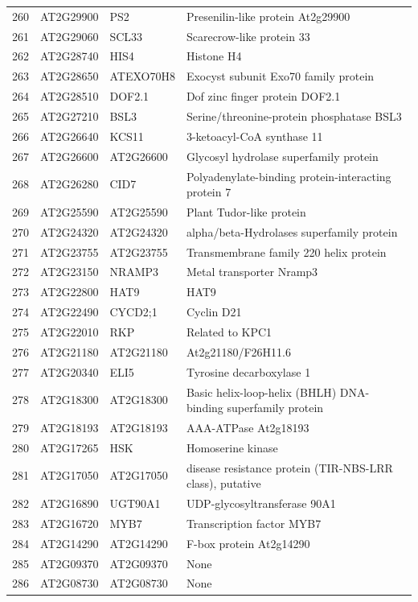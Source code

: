 \documentclass[11pt]{article}
\begin{document}
\begin{center}
\begin{tabular}{rlll}
260 & AT2G29900 & PS2 & Presenilin-like protein At2g29900\\
261 & AT2G29060 & SCL33 & Scarecrow-like protein 33\\
262 & AT2G28740 & HIS4 & Histone H4\\
263 & AT2G28650 & ATEXO70H8 & Exocyst subunit Exo70 family protein\\
264 & AT2G28510 & DOF2.1 & Dof zinc finger protein DOF2.1\\
265 & AT2G27210 & BSL3 & Serine/threonine-protein phosphatase BSL3\\
266 & AT2G26640 & KCS11 & 3-ketoacyl-CoA synthase 11\\
267 & AT2G26600 & AT2G26600 & Glycosyl hydrolase superfamily protein\\
268 & AT2G26280 & CID7 & Polyadenylate-binding protein-interacting protein 7\\
269 & AT2G25590 & AT2G25590 & Plant Tudor-like protein\\
270 & AT2G24320 & AT2G24320 & alpha/beta-Hydrolases superfamily protein\\
271 & AT2G23755 & AT2G23755 & Transmembrane family 220 helix protein\\
272 & AT2G23150 & NRAMP3 & Metal transporter Nramp3\\
273 & AT2G22800 & HAT9 & HAT9\\
274 & AT2G22490 & CYCD2;1 & Cyclin D21\\
275 & AT2G22010 & RKP & Related to KPC1\\
276 & AT2G21180 & AT2G21180 & At2g21180/F26H11.6\\
277 & AT2G20340 & ELI5 & Tyrosine decarboxylase 1\\
278 & AT2G18300 & AT2G18300 & Basic helix-loop-helix (BHLH) DNA-binding superfamily protein\\
279 & AT2G18193 & AT2G18193 & AAA-ATPase At2g18193\\
280 & AT2G17265 & HSK & Homoserine kinase\\
281 & AT2G17050 & AT2G17050 & disease resistance protein (TIR-NBS-LRR class), putative\\
282 & AT2G16890 & UGT90A1 & UDP-glycosyltransferase 90A1\\
283 & AT2G16720 & MYB7 & Transcription factor MYB7\\
284 & AT2G14290 & AT2G14290 & F-box protein At2g14290\\
285 & AT2G09370 & AT2G09370 & None\\
286 & AT2G08730 & AT2G08730 & None\\

\end{tabular}
\end{center}
\end{document}
